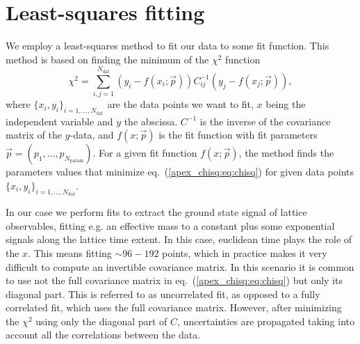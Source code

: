 
\chapter{Least-squares fitting}
\label{apex_chisq}

We employ a least-squares method to fit our data to some fit function. This method is based on finding the  minimum of the $\chi^2$ function
\begin{equation}
\label{apex_chisq:eq:chisq}
\chi^2=\sum_{i,j=1}^{N_{\textrm{dat}}}\left(y_i-f(x_i;\vec{p})\right)C_{ij}^{-1}\left(y_j-f(x_j;\vec{p})\right),
\end{equation}
where $\{x_i,y_i\}_{i=1,...,N_{\textrm{dat}}}$ are the data points we want to fit, $x$ being the independent variable and $y$ the abscissa. $C^{-1}$ is the inverse of the covariance matrix of the $y$-data, and $f(x;\vec{p})$ is the fit function with fit parameters $\vec{p}=(p_1,...,p_{N_{\textrm{param}}})$. For a given fit function $f(x;\vec{p})$, the method finds the parameters values that minimize eq.~(\ref{apex_chisq:eq:chisq}) for given data points $\{x_i,y_i\}_{i=1,...,N_{\textrm{dat}}}$.

In our case we perform fits to extract the ground state signal of lattice observables, fitting e.g. an effective mass to a constant plus some exponential signals along the lattice time extent. In this case, euclidean time plays the role of the $x$. This means fitting $\sim96-192$ points, which in practice makes it very difficult to compute an invertible covariance matrix. In this scenario it is common to use not the full covariance matrix in eq.~(\ref{apex_chisq:eq:chisq}) but only its diagonal part. This is referred to as uncorrelated fit, as opposed to a fully correlated fit, which uses the full covariance matrix. However, after minimizing the $\chi^2$ using only the diagonal part of $C$, uncertainties are propagated taking into account all the correlations between the data.

